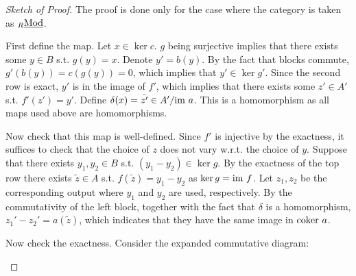 \begin{proof}[Sketch of Proof]
    The proof is done only for the case where the category is taken as ${}_{R}\underline{\textup{Mod}}$.

    First define the map. Let $x \in \ker c$. $g$ being surjective implies that there exists some $y \in B$ s.t. $g(y) = x$. Denote $y' = b(y)$. By the fact that blocks commute, $g'(b(y)) = c(g(y)) = 0$, which implies that $y' \in \ker g'$. Since the second row is exact, $y'$ is in the image of $f'$, which implies that there exists some $z' \in A'$ s.t. $f'(z') = y'$. Define $\delta(x) = \bar{z'} \in A' / \mathrm{im}\  a$. This is a homomorphism as all maps used above are homomorphisms.

    Now check that this map is well-defined. Since $f'$ is injective by the exactness, it suffices to check that the choice of $z$ does not vary w.r.t. the choice of $y$. Suppose that there exists $y_1, y_2 \in B$ s.t. $(y_1 - y_2) \in \ker g$. By the exactness of the top row there exists $\tilde{z} \in A$ s.t. $f(\tilde{z}) = y_1 - y_2$ as $\ker g = \mathrm{im}\  f$. Let $z_1, z_2$ be the corresponding output where $y_1$ and $y_2$ are used, respectively. By the commutativity of the left block, together with the fact that $\delta$ is a homomorphism, $z_1' - z_2' = a(\tilde{z})$, which indicates that they have the same image in $\mathrm{coker}\  a$.

    Now check the exactness. Consider the expanded commutative diagram:
    \begin{figure}[htbp]
        \centering
    \end{figure}


\end{proof}

